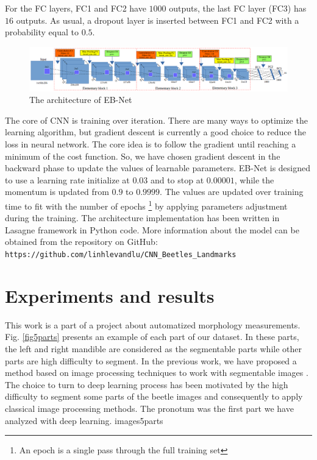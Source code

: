 \documentclass[review]{elsarticle}
\begin{document}
For the FC layers, FC1 and FC2 have $1000$ outputs, the last FC layer (FC3) has $16$ outputs. As usual, a dropout layer is inserted between FC1 and FC2 with a probability equal to $0.5$.

\begin{figure}[h]
	\centering
	\includegraphics[scale=0.3]{images/net3}
	\caption{The architecture of EB-Net}
	\label{fignet3}
\end{figure}

The core of CNN is training over iteration. There are many ways to optimize the learning algorithm, but gradient descent \cite{lecun2012efficient} is currently a good choice to reduce the loss in neural network. The core idea is to follow the gradient until reaching a minimum of the cost function. So, we have chosen gradient descent in the backward phase to update the values of learnable parameters. EB-Net is designed to use a learning rate initialize at $0.03$ and to stop at $0.00001$, while the momentum is updated from $0.9$ to $0.9999$. The values are updated over training time to fit with the number of epochs \footnote{An epoch is a single pass through the full training set} by applying parameters adjustment during the training. The architecture implementation has been written in Lasagne framework \cite{lasagne} in Python code. More information about the model can be obtained from the repository on GitHub: \texttt{https://github.com/linhlevandlu/CNN\_Beetles\_Landmarks}
\section{Experiments and results}
\label{sexperiments}
This work is a part of a project about automatized morphology measurements. Fig. \ref{fig5parts} presents an example of each part of our dataset. In these parts, the left and right mandible are considered as the segmentable parts while other parts are high difficulty to segment. In the previous work, we have proposed a method based on image processing techniques to work with segmentable images \cite{le2017maelab}. The choice to turn to deep learning process has been motivated by the high difficulty to segment some parts of the beetle images and consequently to apply classical image processing methods. The pronotum was the first part we have analyzed with deep learning. images5parts
\end{document}
